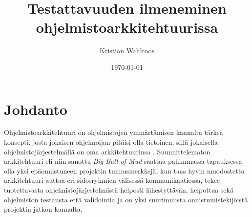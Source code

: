 \documentclass[finnish]{tktltiki2}
\title{Testattavuuden ilmeneminen ohjelmistoarkkitehtuurissa}
\author{Kristian Wahlroos}
\date{\today}
\theoremstyle{definition}
\theoremstyle{remark}
\begin{document}

\frontmatter      %

\maketitle        %
\makeabstract     %

\tableofcontents  %


\mainmatter       %

\section{Johdanto}









Ohjelmistoarkkitehtuuri on ohjelmistojen ymmärtämisen kannalta tärkeä konsepti, josta jokaisen ohjelmoijan pitäisi olla tietoinen, sillä jokaisella ohjelmistojärjestelmällä on oma arkkitehtuurinsa \citep[s. 4]{ieee_2000}. Suunnittelematon arkkitehtuuri eli niin sanottu \textit{Big Ball of Mud} saattaa pahimmassa tapauksessa olla yksi epäonnistuneen projektin tunnusmerkkejä, kun taas hyvin muodostettu arkkitehtuuri auttaa eri sidosryhmien välisessä kommunikaatiossa, tekee tuotettavasta ohjelmistojärjestelmästä helposti lähestyttävän, helpottaa sekä ohjelmiston testausta että validointia ja on yksi suurimmista onnistumistekijöistä projektin jatkon kannalta. 
\end{document}
